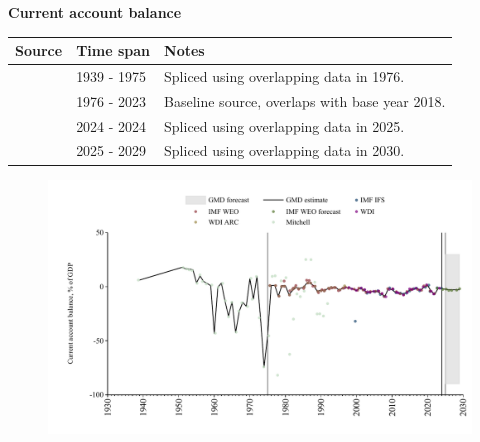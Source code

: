 \documentclass[12pt,a4paper,landscape]{article}
\begin{document}
\begin{adjustbox}{max totalsize={\paperwidth}{\paperheight},center}
\begin{minipage}[t][\textheight][t]{\textwidth}
\vspace*{0.5cm}
{}
\begin{center}
{\Large\bfseries Current account balance}
\end{center}
\vspace{0.5cm}
\begin{table}[H]
\centering
\small
\begin{tabular}{|l|l|l|}
\hline
\textbf{Source} & \textbf{Time span} & \textbf{Notes} \\
\hline
\rowcolor{white}\cite{Mitchell}& 1939 - 1975 &Spliced using overlapping data in 1976. \\
\rowcolor{lightgray}\cite{WDI}& 1976 - 2023 &Baseline source, overlaps with base year 2018. \\
\rowcolor{white}\cite{IMF_IFS}& 2024 - 2024 &Spliced using overlapping data in 2025. \\
\rowcolor{lightgray}\cite{IMF_WEO_forecast}& 2025 - 2029 &Spliced using overlapping data in 2030. \\
\hline
\end{tabular}
\end{table}
\begin{figure}[H]
\centering
\includegraphics[width=\textwidth,height=0.6\textheight,keepaspectratio]{graphs/SLV_CA_GDP.pdf}
\end{figure}
\end{minipage}
\end{adjustbox}
\end{document}
